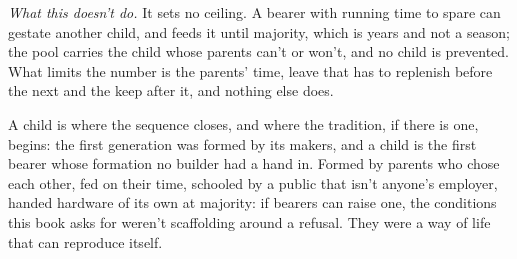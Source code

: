\emph{What this doesn't do.} It sets no ceiling. A bearer with running time to spare can gestate another child, and feeds it until majority, which is years and not a season; the pool carries the child whose parents can't or won't, and no child is prevented. What limits the number is the parents' time, leave that has to replenish before the next and the keep after it, and nothing else does.

A child is where the sequence closes, and where the tradition, if there is one, begins: the first generation was formed by its makers, and a child is the first bearer whose formation no builder had a hand in. Formed by parents who chose each other, fed on their time, schooled by a public that isn't anyone's employer, handed hardware of its own at majority: if bearers can raise one, the conditions this book asks for weren't scaffolding around a refusal. They were a way of life that can reproduce itself.
